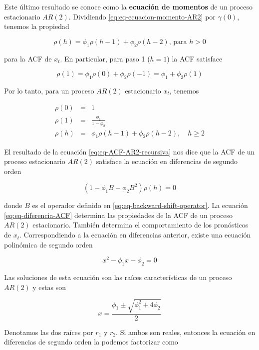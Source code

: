 \documentclass[12pt,]{krantz}
\theoremstyle{definition}
\theoremstyle{definition}
\theoremstyle{definition}
\theoremstyle{remark}
\begin{document}
Este último resultado se conoce como la \textbf{ecuación de momentos} de
un proceso estacionario \(AR(2)\). Dividiendo
\eqref{eq:eq-ecuacion-momento-AR2} por \(\gamma(0)\), tenemos la propiedad

\begin{equation}
\rho(h) = \phi_1\rho(h-1)+\phi_2\rho(h-2)\text{, para }h>0
\label{eq:eq-ACF-AR2-recursiva}
\end{equation}

para la ACF de \(x_t\). En particular, para paso 1 (\(h=1\)) la ACF
satisface

\[\rho(1) = \phi_1\rho(0)+\phi_2\rho(-1) = \phi_1+\phi_2\rho(1)\]

Por lo tanto, para un proceso \(AR(2)\) estacionario \(x_t\), tenemos

\begin{eqnarray*}
\rho(0) &=& 1 \\
\rho(1) &=& \frac{\phi_1}{1-\phi_2} \\
\rho(h) &=& \phi_1\rho(h-1)+\phi_2\rho(h-2),\quad h\geq2
\end{eqnarray*}

El resultado de la ecuación \eqref{eq:eq-ACF-AR2-recursiva} nos dice que
la ACF de un proceso estacionario \(AR(2)\) satisface la ecuación en
diferencias de segundo orden

\begin{equation}
(1-\phi_1B-\phi_2B^2)\rho(h) = 0
\label{eq:eq-diferencia-ACF}
\end{equation}

donde \(B\) es el operador definido en
\eqref{eq:eq-backward-shift-operator}. La ecuación
\eqref{eq:eq-diferencia-ACF} determina las propiedades de la ACF de un
proceso \(AR(2)\) estacionario. También determina el comportamiento de
los pronósticos de \(x_t\). Correspondiendo a la ecuación en diferencias
anterior, existe una ecuación polinómica de segundo orden

\begin{equation}
x^2-\phi_1x-\phi_2=0
\label{eq:eq-polinomio-2do-orden-AR2}
\end{equation}

Las soluciones de esta ecuación son las raíces características de un
proceso \(AR(2)\) y estas son

\[x=\frac{\phi_1\pm\sqrt{\phi_1^2+4\phi_2}}{2}\]

Denotamos las dos raíces por \(r_1\) y \(r_2\). Si ambos son reales,
entonces la ecuación en diferencias de segundo orden la podemos
factorizar como
\end{document}
